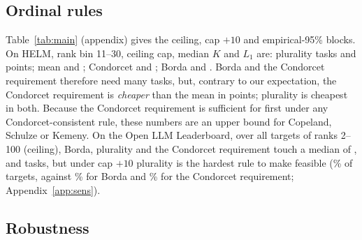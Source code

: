 \begin{table}[tb]
\caption{Minimum uniform gain cap $h^\ast$ (points) for first place by rank bin: median with 95\% bootstrap interval over targets (none for fewer than 3 targets) for the mean, median and minimum rules, and the share of targets whose $h^\ast$ exceeds the pooled 95th percentile of fine-tuning gains (\empPooled) and, on HELM, the MMLU-Pro value that the HELM empirical caps use (\empMmluQ). Infeasible counts as exceeding. \ollbShareOverHundred\% of the Open LLM Leaderboard targets rank beyond 100 and dominate its all-target median (\hstarOllbMean); rank 2 is one target. Score rules only.}
\label{tab:hstar}
\centering\scriptsize
\resizebox{\linewidth}{!}{}
\end{table}

\subsection{Ordinal rules}
\label{sec:exp-ordinal}

Table~\ref{tab:main} (appendix) gives the ceiling, cap $+10$ and empirical-95\% blocks. On HELM, rank bin 11--30, ceiling cap, median $K$ and $L_1$ are: plurality \binKHelmPlurality{} tasks and \binLHelmPlurality{} points; mean \binKHelmMean{} and \binLHelmMean; Condorcet \binKHelmCondorcet{} and \binLHelmCondorcet; Borda \binKHelmBorda{} and \binLHelmBorda. Borda and the Condorcet requirement therefore need many tasks, but, contrary to our expectation, the Condorcet requirement is \emph{cheaper} than the mean in points; plurality is cheapest in both. Because the Condorcet requirement is sufficient for first under any Condorcet-consistent rule, these numbers are an upper bound for Copeland, Schulze or Kemeny. On the Open LLM Leaderboard, over all \cvxOllbLinearN{} targets of ranks 2--100 (ceiling), Borda, plurality and the Condorcet requirement touch a median of \ordHundredCeilBordaK, \ordHundredCeilPluralityK{} and \ordHundredCeilCondorcetK{} tasks, but under cap $+10$ plurality is the hardest rule to make feasible (\ordHundredTenPluralityFeas\% of targets, against \ordHundredTenBordaFeas\% for Borda and \ordHundredTenCondorcetFeas\% for the Condorcet requirement; Appendix~\ref{app:sens}).

\subsection{Robustness}
\label{sec:exp-robust}

